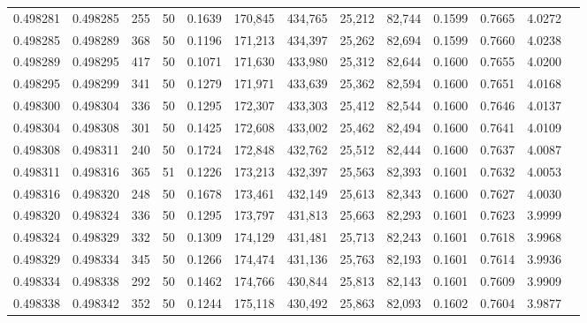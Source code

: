 \begin{tabular}{rrrrrrrrrrrrr}
0.498281 & 0.498285 & 255 &  50 &                                     0.1639 & 170,845 & 434,765 &  25,212 &  82,744 & 0.1599 & 0.7665 & 4.0272 \\
0.498285 & 0.498289 & 368 &  50 &                                     0.1196 & 171,213 & 434,397 &  25,262 &  82,694 & 0.1599 & 0.7660 & 4.0238 \\
0.498289 & 0.498295 & 417 &  50 &                                     0.1071 & 171,630 & 433,980 &  25,312 &  82,644 & 0.1600 & 0.7655 & 4.0200 \\
0.498295 & 0.498299 & 341 &  50 &                                     0.1279 & 171,971 & 433,639 &  25,362 &  82,594 & 0.1600 & 0.7651 & 4.0168 \\
0.498300 & 0.498304 & 336 &  50 &                                     0.1295 & 172,307 & 433,303 &  25,412 &  82,544 & 0.1600 & 0.7646 & 4.0137 \\
0.498304 & 0.498308 & 301 &  50 &                                     0.1425 & 172,608 & 433,002 &  25,462 &  82,494 & 0.1600 & 0.7641 & 4.0109 \\
0.498308 & 0.498311 & 240 &  50 &                                     0.1724 & 172,848 & 432,762 &  25,512 &  82,444 & 0.1600 & 0.7637 & 4.0087 \\
0.498311 & 0.498316 & 365 &  51 &                                     0.1226 & 173,213 & 432,397 &  25,563 &  82,393 & 0.1601 & 0.7632 & 4.0053 \\
0.498316 & 0.498320 & 248 &  50 &                                     0.1678 & 173,461 & 432,149 &  25,613 &  82,343 & 0.1600 & 0.7627 & 4.0030 \\
0.498320 & 0.498324 & 336 &  50 &                                     0.1295 & 173,797 & 431,813 &  25,663 &  82,293 & 0.1601 & 0.7623 & 3.9999 \\
0.498324 & 0.498329 & 332 &  50 &                                     0.1309 & 174,129 & 431,481 &  25,713 &  82,243 & 0.1601 & 0.7618 & 3.9968 \\
0.498329 & 0.498334 & 345 &  50 &                                     0.1266 & 174,474 & 431,136 &  25,763 &  82,193 & 0.1601 & 0.7614 & 3.9936 \\
0.498334 & 0.498338 & 292 &  50 &                                     0.1462 & 174,766 & 430,844 &  25,813 &  82,143 & 0.1601 & 0.7609 & 3.9909 \\
0.498338 & 0.498342 & 352 &  50 &                                     0.1244 & 175,118 & 430,492 &  25,863 &  82,093 & 0.1602 & 0.7604 & 3.9877 \\

\end{tabular}
